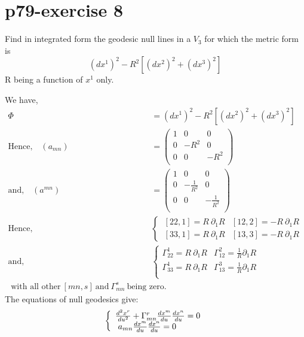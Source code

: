 \section{p79-exercise 8}
\begin{tcolorbox}
Find in integrated form the geodesic null lines in a $V_3$ for which the metric form is$$(dx^1)^2 -R^2[(dx^2)^2+(dx^3)^2]$$
R being a function of $x^1$ only.
\end{tcolorbox}
We have,
\begin{align}
\Phi &= (dx^1)^2 -R^2[(dx^2)^2+(dx^3)^2]\\
\text{Hence,}\quad (a_{mn}) &= \begin{pmatrix}
 1&0  & 0 \\
 0& -R^2 & 0 \\
 0& 0 &  -R^2 \\
\end{pmatrix}\\
\text{and,}\quad (a^{mn}) &= \begin{pmatrix}
 1&0  & 0 \\
 0& -\frac{1}{R^2} & 0 \\
 0& 0 &  -\frac{1}{R^2} \\
\end{pmatrix}\\
\text{Hence,}\quad & \left \{ \begin{array}{ll}
\ [22,1] = R \ \partial_1 R &[12,2] = -R \ \partial_1 R\\
\ [33,1] = R \ \partial_1 R & [13,3] = -R \ \partial_1 R
\end{array} \right.\\
\text{and,}\quad & \left \{ \begin{array}{ll}
\Gamma^1_{22}  = R \ \partial_1 R &\Gamma^2_{12}  = \frac{1}{R}\partial_1 R \\
\Gamma^1_{33}  = R \ \partial_1 R &\Gamma^3_{13}  = \frac{1}{R}\partial_1 R \\
\end{array} \right.\\
\text{ with all other} \ [mn,s] \ \text{and}\ \Gamma^s_{mn} \ \text{being zero.}
\end{align}
The equations of null geodesics give:
\begin{align}
\left \{ \begin{array}{l}
\dv[2] {x^r}{u} + \Gamma^r_{mn}\dv{x^m}{u}\dv{x^n}{u} = 0\\
\ a_{mn}\dv{x^m}{u}\dv{x^n}{u} = 0 \end{array}\right.
\end{align}
